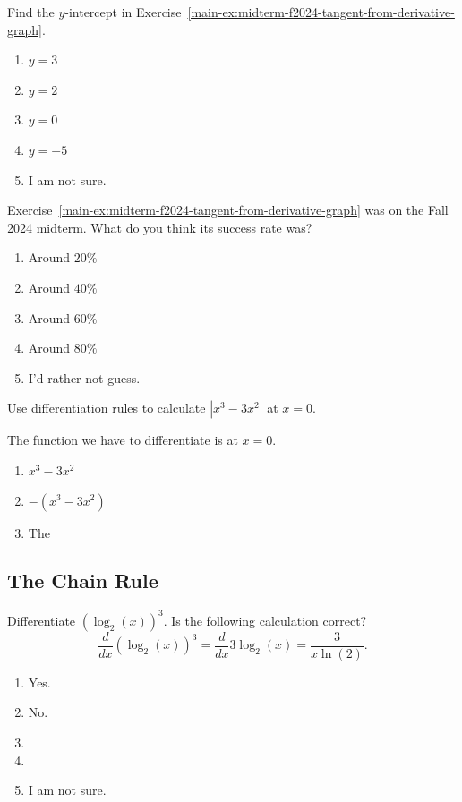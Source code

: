 \documentclass[aspectratio=169, 14pt, t]{beamer}  %
\begin{document}
\begin{poll}
  Find the \(y\)-intercept in Exercise~\ref{main-ex:midterm-f2024-tangent-from-derivative-graph}.

  \begin{enumerate}
    \item \(y = 3\)
    \item \(y = 2\)
    \item \(y = 0\)
    \item \(y = -5\)
    \item I am not sure.
  \end{enumerate}
\end{poll}

\begin{poll}
  Exercise~\ref{main-ex:midterm-f2024-tangent-from-derivative-graph} was on the Fall 2024 midterm. What do you think its success rate was?

  \begin{enumerate}
    \item Around \(20\%\)
    \item Around \(40\%\)
    \item Around \(60\%\)
    \item Around \(80\%\)
    \item I'd rather not guess.
  \end{enumerate}
\end{poll}

\begin{poll}
  Use differentiation rules to calculate \(|x^{3} - 3x^{2}|\) at \(x = 0\).

  The function we have to differentiate is \underline{\hspace{2cm}} at \(x = 0\).
  \begin{enumerate}
    \item \(x^{3} - 3x^{2}\)
    \item \(-(x^{3} - 3x^{2})\)
    \item The
  \end{enumerate}
\end{poll}

\subsection{The Chain Rule}

\begin{poll}
  Differentiate \(\left(\log_{2}(x)\right)^{3}\). Is the following calculation correct?
  \[
    \frac{d}{dx} \left(\log_{2}(x)\right)^{3} = \frac{d}{dx} 3 \log_{2}(x) = \frac{3}{x \ln(2)}.
  \]


  \begin{enumerate}
    \item Yes.
    \item No.
    \item
    \item
    \item I am not sure.
  \end{enumerate}
\end{poll}
\end{document}
